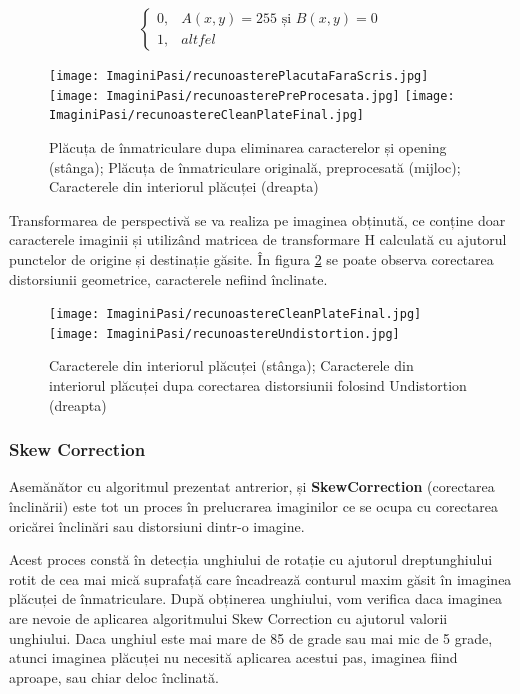\documentclass[12pt]{article}
\begin{document}
\begin{equation}
\begin{cases}
0, & A(x,y) = 255 \text{ și } B(x,y) = 0 \\
1, & altfel
\label{eq:bitwise}
\end{cases}
\end{equation}

\begin{figure}[H]
  \centering
  \texttt{[image: ImaginiPasi/recunoasterePlacutaFaraScris.jpg]}\hfill
    \texttt{[image: ImaginiPasi/recunoasterePreProcesata.jpg]}\hfill
    \texttt{[image: ImaginiPasi/recunoastereCleanPlateFinal.jpg]}
  \caption{Pl\u{a}cuța de \^{i}nmatriculare dupa eliminarea caracterelor și opening (st\^{a}nga); Pl\u{a}cuța de \^{i}nmatriculare original\u{a}, preprocesat\u{a} (mijloc); Caracterele din interiorul pl\u{a}cuței (dreapta)}
  \label{fig:recunoastere_bitwise}
\end{figure}

Transformarea de perspectiv\u{a} se va realiza pe imaginea obținut\u{a}, ce conține doar caracterele imaginii și utiliz\^{a}nd matricea de transformare H calculat\u{a} cu ajutorul punctelor de origine și destinație g\u{a}site. \^{I}n figura \ref{fig:recunoastere_rezultat} se poate observa corectarea distorsiunii geometrice, caracterele nefiind \^{i}nclinate.

\begin{figure}[H]
  \centering
  \texttt{[image: ImaginiPasi/recunoastereCleanPlateFinal.jpg]}\hfill
    \texttt{[image: ImaginiPasi/recunoastereUndistortion.jpg]}
  \caption{Caracterele din interiorul pl\u{a}cuței (st\^{a}nga); Caracterele din interiorul pl\u{a}cuței dupa corectarea distorsiunii folosind Undistortion (dreapta)}
  \label{fig:recunoastere_rezultat}
\end{figure}

\subsubsection{Skew Correction}

Asem\u{a}n\u{a}tor cu algoritmul prezentat antrerior,  și \textbf{SkewCorrection} (corectarea \^{i}nclin\u{a}rii) este tot un proces \^{i}n prelucrarea imaginilor ce se ocupa cu corectarea oric\u{a}rei \^{i}nclin\u{a}ri sau distorsiuni dintr-o imagine. 

Acest proces const\u{a} \^{i}n detecția unghiului de rotație cu ajutorul dreptunghiului rotit de cea mai mic\u{a} suprafaț\u{a} care \^{i}ncadreaz\u{a} conturul maxim g\u{a}sit \^{i}n imaginea pl\u{a}cuței de \^{i}nmatriculare. Dup\u{a} obținerea unghiului, vom verifica daca imaginea are nevoie de aplicarea algoritmului Skew Correction cu ajutorul valorii unghiului. Daca unghiul este mai mare de 85 de grade sau mai mic de 5 grade, atunci imaginea pl\u{a}cuței nu necesit\u{a} aplicarea acestui pas, imaginea fiind aproape, sau chiar deloc \^{i}nclinat\u{a}.
\end{document}
